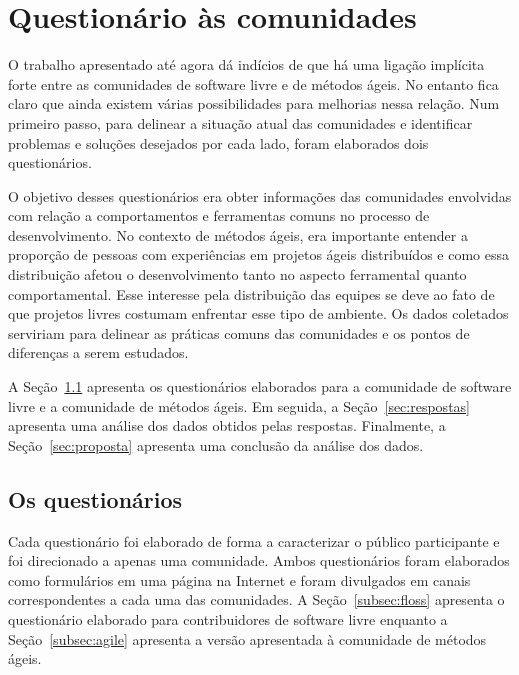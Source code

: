 \chapter{Questionário às comunidades}
\label{cap:pesquisas}


O trabalho apresentado até agora dá indícios de que há uma ligação
implícita forte entre as comunidades de software livre e de métodos
ágeis. No entanto fica claro que ainda existem várias possibilidades
para melhorias nessa relação. Num primeiro passo, para delinear a
situação atual das comunidades e identificar problemas e soluções
desejados por cada lado, foram elaborados dois questionários.

O objetivo desses questionários era obter informações das comunidades
envolvidas com relação a comportamentos e ferramentas comuns no
processo de desenvolvimento. No contexto de métodos ágeis, era
importante entender a proporção de pessoas com experiências em
projetos ágeis distribuídos e como essa distribuição afetou o
desenvolvimento tanto no aspecto ferramental quanto
comportamental. Esse interesse pela distribuição das equipes se deve
ao fato de que projetos livres costumam enfrentar esse tipo de
ambiente. Os dados coletados serviriam para delinear as práticas
comuns das comunidades e os pontos de diferenças a serem estudados.

A Seção~\ref{sec:questionarios} apresenta os questionários elaborados
para a comunidade de software livre e a comunidade de métodos
ágeis. Em seguida, a Seção~\ref{sec:respostas} apresenta uma análise
dos dados obtidos pelas respostas. Finalmente, a
Seção~\ref{sec:proposta} apresenta uma conclusão da análise dos dados.

\section{Os questionários}
\label{sec:questionarios}

Cada questionário foi elaborado de forma a caracterizar o público
participante e foi direcionado a apenas uma comunidade. Ambos
questionários foram elaborados como formulários em uma página na
Internet e foram divulgados em canais correspondentes a cada uma das
comunidades. A Seção~\ref{subsec:floss} apresenta o questionário
elaborado para contribuidores de software livre enquanto a
Seção~\ref{subsec:agile} apresenta a versão apresentada à comunidade
de métodos ágeis.

